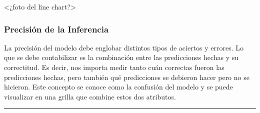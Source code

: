 \documentclass[a4paper]{article}
\begin{document}
<¿foto del line chart?>

\subsubsection{Precisión de la Inferencia}

La precisión del modelo debe englobar distintos tipos de aciertos y errores. Lo que se debe contabilizar es la combinación entre las predicciones hechas y su correctitud. Es decir, nos importa medir tanto cuán correctas fueron las predicciones hechas, pero también qué predicciones se debieron hacer pero no se hicieron. Este concepto se conoce como la confusión del modelo y se puede visualizar en una grilla que combine estos dos atributos.

\begin{figure}[H]
\end{figure}

\hrule
\end{document}
